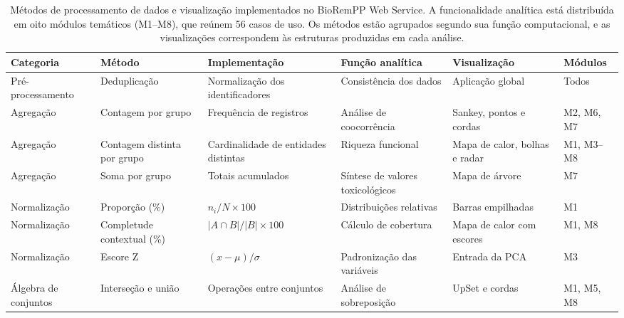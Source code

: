 \begin{table}[!p]
\caption{Métodos de processamento de dados e visualização implementados no
BioRemPP Web Service. A funcionalidade analítica está distribuída em oito
módulos temáticos (M1--M8), que reúnem 56 casos de uso. Os métodos estão
agrupados segundo sua função computacional, e as visualizações correspondem às
estruturas produzidas em cada análise.}
\label{tab:c3-data-processing}
\scriptsize
\centering
\begin{tabularx}{\textwidth}{
    @{}
    p{1.75cm}
    p{2.25cm}
    p{2.65cm}
    X
    p{2.55cm}
    p{1.15cm}
    @{}
}
\toprule
\textbf{Categoria}
& \textbf{Método}
& \textbf{Implementação}
& \textbf{Função analítica}
& \textbf{Visualização}
& \textbf{Módulos} \\
\midrule

Pré-processamento
& Deduplicação
& Normalização dos identificadores
& Consistência dos dados
& Aplicação global
& Todos \\

\addlinespace[0.3em]

Agregação
& Contagem por grupo
& Frequência de registros
& Análise de coocorrência
& Sankey, pontos e cordas
& M2, M6, M7 \\

Agregação
& Contagem distinta por grupo
& Cardinalidade de entidades distintas
& Riqueza funcional
& Mapa de calor, bolhas e radar
& M1, M3--M8 \\

Agregação
& Soma por grupo
& Totais acumulados
& Síntese de valores toxicológicos
& Mapa de árvore
& M7 \\

\addlinespace[0.3em]

Normalização
& Proporção (\%)
& $n_i/N \times 100$
& Distribuições relativas
& Barras empilhadas
& M1 \\

Normalização
& Completude contextual (\%)
& $\lvert A \cap B\rvert/\lvert B\rvert \times 100$
& Cálculo de cobertura
& Mapa de calor com escores
& M1, M8 \\

Normalização
& Escore Z
& $(x-\mu)/\sigma$
& Padronização das variáveis
& Entrada da PCA
& M3 \\

\addlinespace[0.3em]

Álgebra de conjuntos
& Interseção e união
& Operações entre conjuntos
& Análise de sobreposição
& UpSet e cordas
& M1, M5, M8 \\


\end{tabularx}
\end{table}
